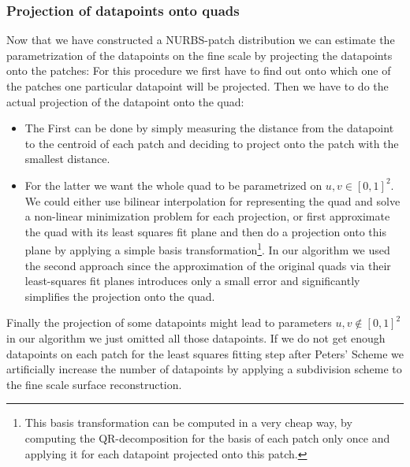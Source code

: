 \subsubsection{Projection of datapoints onto quads}
Now that we have constructed a \ac{NURBS}-patch distribution we can estimate the parametrization of the datapoints on the fine scale by projecting the datapoints onto the patches: For this procedure we first have to find out onto which one of the patches one particular datapoint will be projected. Then we have to do the actual projection of the datapoint onto the quad: 
\begin{itemize}
\item The First can be done by simply measuring the distance from the datapoint to the centroid of each patch and deciding to project onto the patch with the smallest distance. 

\item For the latter we want the whole \ac{quad} to be parametrized on $u,v\in\left[0,1\right]^2$. We could either use bilinear interpolation for representing the quad and solve a non-linear minimization problem for each projection, or first approximate the quad with its least squares fit plane and then do a projection onto this plane by applying a simple basis transformation\footnote{This basis transformation can be computed in a very cheap way, by computing the QR-decomposition for the basis of each patch only once and applying it for each datapoint projected onto this patch.}. In our algorithm we used the second approach since the approximation of the original \acp{quad} via their least-squares fit planes introduces only a small error and significantly simplifies the projection onto the \ac{quad}.
\end{itemize}
Finally the projection of some datapoints might lead to parameters $u,v\not\in\left[0,1\right]^2$ in our algorithm we just omitted all those datapoints. If we do not get enough datapoints on each patch for the least squares fitting step after Peters' Scheme we artificially increase the number of datapoints by applying a subdivision scheme  to the fine scale surface reconstruction.

